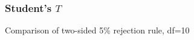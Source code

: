 \documentclass[handout]{beamer}
\begin{document}


   \begin{frame}
   \frametitle{Student's $T$}
   \begin{center}
   \end{center}
   Comparison of two-sided {\color{blue} 5\% rejection rule}, df=10
   \end{frame}

\end{document}
